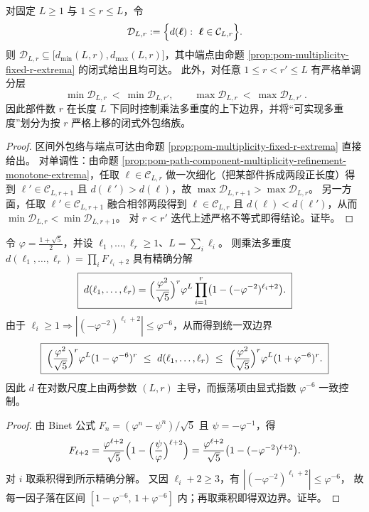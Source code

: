 \begin{corollary}\label{cor:pom-multiplicity-fixed-L-r-envelope}
对固定 \(L\ge 1\) 与 \(1\le r\le L\)，令
\[
\mathcal{D}_{L,r}:=\Bigl\{d(\boldsymbol{\ell}):\ \boldsymbol{\ell}\in\mathcal{C}_{L,r}\Bigr\}.
\]
则 \(\mathcal{D}_{L,r}\subseteq\bigl[d_{\min}(L,r),d_{\max}(L,r)\bigr]\)，其中端点由命题 \ref{prop:pom-multiplicity-fixed-r-extrema} 的闭式给出且均可达。
此外，对任意 \(1\le r<r'\le L\) 有严格单调分层
\[
\boxed{\ \min\mathcal{D}_{L,r}\ <\ \min\mathcal{D}_{L,r'},\qquad
\max\mathcal{D}_{L,r}\ <\ \max\mathcal{D}_{L,r'}\ } .
\]
因此部件数 \(r\) 在长度 \(L\) 下同时控制乘法多重度的上下边界，并将“可实现多重度”划分为按 \(r\) 严格上移的闭式外包络族。
\end{corollary}
\begin{proof}
区间外包络与端点可达由命题 \ref{prop:pom-multiplicity-fixed-r-extrema} 直接给出。
对单调性：由命题 \ref{prop:pom-path-component-multiplicity-refinement-monotone-extrema}，任取 \(\boldsymbol{\ell}\in\mathcal{C}_{L,r}\) 做一次细化（把某部件拆成两段正长度）得到 \(\boldsymbol{\ell}'\in\mathcal{C}_{L,r+1}\) 且 \(d(\boldsymbol{\ell}')>d(\boldsymbol{\ell})\)，故 \(\max\mathcal{D}_{L,r+1}>\max\mathcal{D}_{L,r}\)。
另一方面，任取 \(\boldsymbol{\ell}'\in\mathcal{C}_{L,r+1}\) 融合相邻两段得到 \(\boldsymbol{\ell}\in\mathcal{C}_{L,r}\) 且 \(d(\boldsymbol{\ell})<d(\boldsymbol{\ell}')\)，从而 \(\min\mathcal{D}_{L,r}<\min\mathcal{D}_{L,r+1}\)。
对 \(r<r'\) 迭代上述严格不等式即得结论。证毕。
\end{proof}

\begin{proposition}\label{prop:pom-multiplicity-binet-two-parameter-normal-form}
令 \(\varphi=\frac{1+\sqrt5}{2}\)，并设 \(\ell_1,\dots,\ell_r\ge 1\)、\(L=\sum_i\ell_i\)。
则乘法多重度 \(d(\ell_1,\dots,\ell_r)=\prod_i F_{\ell_i+2}\) 具有精确分解
\[
\boxed{\;
d(\ell_1,\dots,\ell_r)
=\Bigl(\frac{\varphi^2}{\sqrt5}\Bigr)^r\varphi^{L}\prod_{i=1}^r\bigl(1-(-\varphi^{-2})^{\ell_i+2}\bigr).\;}
\]
由于 \(\ell_i\ge 1\Rightarrow |(-\varphi^{-2})^{\ell_i+2}|\le \varphi^{-6}\)，从而得到统一双边界
\[
\boxed{\;
\Bigl(\frac{\varphi^2}{\sqrt5}\Bigr)^r\varphi^{L}(1-\varphi^{-6})^r
\ \le\
d(\ell_1,\dots,\ell_r)
\ \le\
\Bigl(\frac{\varphi^2}{\sqrt5}\Bigr)^r\varphi^{L}(1+\varphi^{-6})^r.\;}
\]
因此 \(d\) 在对数尺度上由两参数 \((L,r)\) 主导，而振荡项由显式指数 \(\varphi^{-6}\) 一致控制。
\end{proposition}
\begin{proof}
由 Binet 公式 \(F_n=(\varphi^n-\psi^n)/\sqrt5\) 且 \(\psi=-\varphi^{-1}\)，得
\[
F_{\ell+2}=\frac{\varphi^{\ell+2}}{\sqrt5}\Bigl(1-\Bigl(\frac{\psi}{\varphi}\Bigr)^{\ell+2}\Bigr)
=\frac{\varphi^{\ell+2}}{\sqrt5}\bigl(1-(-\varphi^{-2})^{\ell+2}\bigr).
\]
对 \(i\) 取乘积得到所示精确分解。
又因 \(\ell_i+2\ge 3\)，有
\(
|(-\varphi^{-2})^{\ell_i+2}|\le \varphi^{-6}
\)，
故每一因子落在区间 \([1-\varphi^{-6},\,1+\varphi^{-6}]\) 内；再取乘积即得双边界。证毕。
\end{proof}

